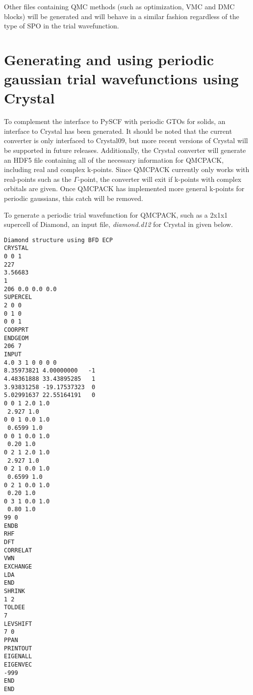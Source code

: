 Other files containing QMC methods (such as optimization, VMC and DMC blocks) will be generated and will behave in a similar fashion regardless of the type of SPO in the trial wavefunction. 


\section{Generating and using periodic gaussian trial wavefunctions using Crystal}

To complement the interface to PySCF with periodic GTOs for solids, an interface to Crystal \cite{Crystal} has been generated.
It should be noted that the current converter is only interfaced to Crystal09, but more recent versions of Crystal will be supported in future releases. 
Additionally, the Crystal converter will generate an HDF5 file containing all of the necessary information for QMCPACK, including real and complex k-points.
Since QMCPACK currently only works with real-points such as the $\Gamma$-point, the converter will exit if k-points with complex orbitals are given. 
Once QMCPACK has implemented more general k-points for periodic gaussians, this catch will be removed.


To generate a periodic trial wavefunction for QMCPACK, such as a 2x1x1 supercell of Diamond, an input file, {\it diamond.d12} for Crystal in given below.  
\begin{lstlisting}[caption=diamond.d12. Example Crystal input file to generate wavefunction at the $\Gamma$ point]
Diamond structure using BFD ECP
CRYSTAL
0 0 1
227 
3.56683
1 
206 0.0 0.0 0.0
SUPERCEL
2 0 0
0 1 0
0 0 1
COORPRT
ENDGEOM
206 7
INPUT
4.0 3 1 0 0 0 0
8.35973821 4.00000000   -1
4.48361888 33.43895285   1
3.93831258 -19.17537323  0
5.02991637 22.55164191   0
0 0 1 2.0 1.0
 2.927 1.0
0 0 1 0.0 1.0
 0.6599 1.0
0 0 1 0.0 1.0
 0.20 1.0 
0 2 1 2.0 1.0
 2.927 1.0
0 2 1 0.0 1.0
 0.6599 1.0
0 2 1 0.0 1.0
 0.20 1.0 
0 3 1 0.0 1.0
 0.80 1.0
99 0
ENDB
RHF
DFT
CORRELAT
VWN
EXCHANGE
LDA
END
SHRINK
1 2
TOLDEE
7
LEVSHIFT
7 0
PPAN
PRINTOUT
EIGENALL
EIGENVEC
-999
END
END
\end{lstlisting}

